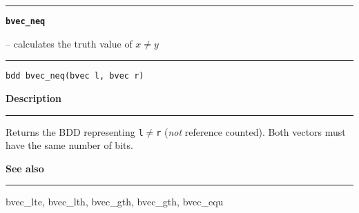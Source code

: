 \begin{minipage}{\textwidth}

\noindent\begin{minipage}{\textwidth}
\rule{\textwidth}{0.5mm}
{\tt\bf bvec\_neq }
\--- calculates the truth value of $x \neq y$  \hspace{\fill}
\\\rule[1.5ex]{\textwidth}{0.5mm}
\end{minipage}

\noindent\begin{verbatim}
bdd bvec_neq(bvec l, bvec r) 
\end{verbatim}

\vspace{\parsep}\noindent
{\bf Description}\\\rule[1.5ex]{\textwidth}{0.2mm}\vspace{-1.5ex}\setlength{\parindent}{1em}
Returns the BDD representing {\tt l}$\neq${\tt r}
           ({\em not} reference counted). Both vectors must have the
	   same number of bits. 

\vspace{\parsep}\vspace{\baselineskip}\noindent
{\bf See also}\\\rule[1.5ex]{\textwidth}{0.2mm}\vspace{-1.5ex}
bvec\_lte, bvec\_lth, bvec\_gth, bvec\_gth, bvec\_equ 
\end{minipage}
\vspace{8ex}
